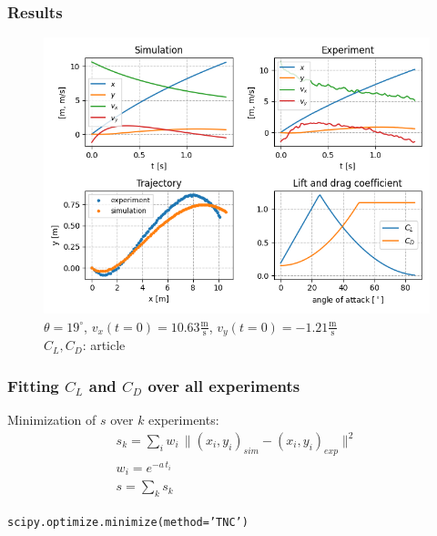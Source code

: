 \documentclass{beamer}
\begin{document}

\begin{frame}

\frametitle{Results}

\begin{figure}[H]
	\centering
	  \includegraphics[width=0.85 \textwidth]{strmo_clanek_vse.png}
	  \captionsetup{justification=centering,margin=0cm}
	  \caption{$\theta = 19 ^{\circ}$, $v_x(t = 0) = 10.63 \mathrm{\frac{m}{s}}$, $v_y(t = 0) = -1.21 \mathrm{\frac{m}{s}}$ \\
	  $C_L, C_D$: article \cite{clanek}}
\end{figure}


\end{frame}


\begin{frame}

\frametitle{Fitting $C_L$ and $C_D$ over all experiments}

\begin{block}{Minimization of $s$ over $k$ experiments:}
\begin{gather}
s_k = \sum_{i} w_i \, \| (x_i, y_i)_{sim} - (x_i, y_i)_{exp} \|^2 \\
w_i = e^{-a \, t_i}\\
s = \sum_k s_k
\end{gather}

\begin{center}
\texttt{scipy.optimize.minimize(method='TNC')}
\end{center}
\end{block}

\end{frame}
\end{document}

